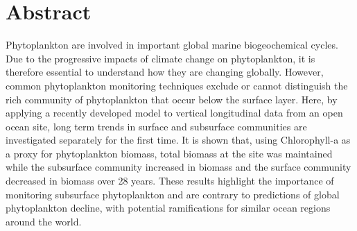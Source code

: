 \documentclass{article}
\begin{document}
\newpage
\tableofcontents
\newpage
{}
\section{Abstract}
Phytoplankton are involved in important global marine biogeochemical cycles. Due to the progressive impacts of climate change on phytoplankton, it is therefore essential to understand how they are changing globally. However, common phytoplankton monitoring techniques exclude or cannot distinguish the rich community of phytoplankton that occur below the surface layer. Here, by applying a recently developed model to vertical longitudinal data from an open ocean site, long term trends in surface and subsurface communities are investigated separately for the first time. It is shown that, using Chlorophyll-a as a proxy for phytoplankton biomass, total biomass at the site was maintained while the subsurface community increased in biomass and the surface community decreased in biomass over 28 years. These results highlight the importance of monitoring subsurface phytoplankton and are contrary to predictions of global phytoplankton decline, with potential ramifications for similar ocean regions around the world.
\end{document}
